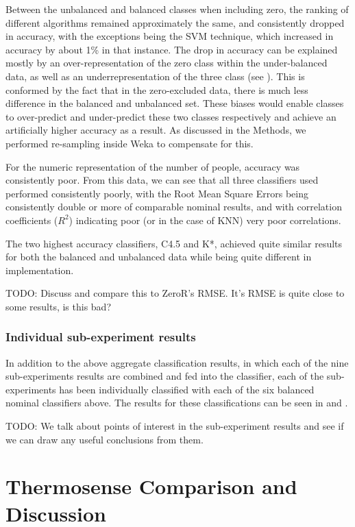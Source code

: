 \documentclass[../thesis/thesis.tex]{subfiles}
\begin{document}
Between the unbalanced and balanced classes when including zero, the ranking of different algorithms remained approximately the same, and consistently dropped in accuracy, with the exceptions being the SVM technique, which increased in accuracy by about 1\% in that instance. The drop in accuracy can be explained mostly by an over-representation of the zero class within the under-balanced data, as well as an underrepresentation of the three class (see ). This is conformed by the fact that in the zero-excluded data, there is much less difference in the balanced and unbalanced set. These biases would enable classes to over-predict and under-predict these two classes respectively and achieve an artificially higher accuracy as a result. As discussed in the Methods, we performed re-sampling inside Weka to compensate for this.

For the numeric representation of the number of people, accuracy was consistently poor. From this data, we can see that all three classifiers used performed consistently poorly, with the Root Mean Square Errors being consistently double or more of comparable nominal results, and with correlation coefficients ($R^2$) indicating poor (or in the case of KNN) very poor correlations.

The two highest accuracy classifiers, C4.5 and K*, achieved quite similar results for both the balanced and unbalanced data while being quite different in implementation. %

TODO: Discuss and compare this to ZeroR's RMSE. It's RMSE is quite close to some results, is this bad?

\subsubsection{Individual sub-experiment results}

In addition to the above aggregate classification results, in which each of the nine sub-experiments results are combined and fed into the classifier, each of the sub-experiments has been individually classified with each of the six balanced nominal classifiers above. The results for these classifications can be seen in  and .

TODO: We talk about points of interest in the sub-experiment results and see if we can draw any useful conclusions from them.

\section{Thermosense Comparison and Discussion}
\end{document}
